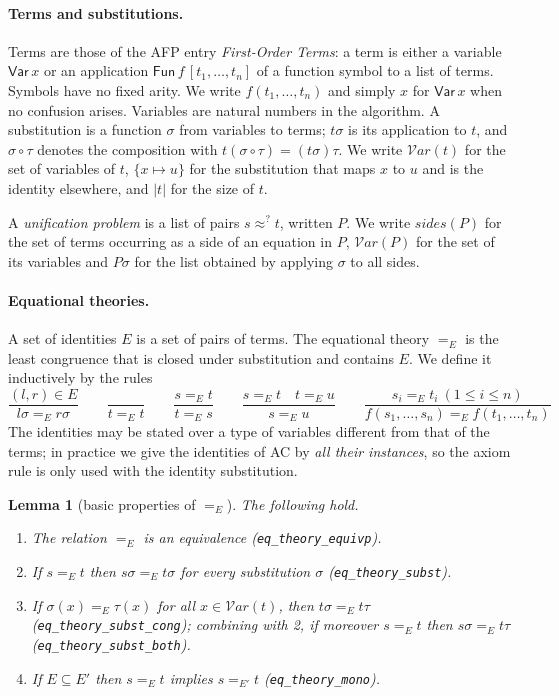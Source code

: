 \documentclass[11pt,a4paper]{article}
\newtheorem{lemma}[theorem]{Lemma}
\theoremstyle{definition}
\theoremstyle{remark}
\newcommand{\isa}[1]{\mbox{\small\texttt{#1}}}
\newcommand{\Var}{\mathsf{Var}}
\newcommand{\Fun}{\mathsf{Fun}}
\newcommand{\vars}{\mathcal{V}\mathit{ar}}
\newcommand{\sides}{\mathit{sides}}
\begin{document}
\paragraph{Terms and substitutions.}
Terms are those of the AFP entry \emph{First-Order Terms}: a term is either a variable $\Var\,x$
or an application $\Fun\,f\,[t_1,\dots,t_n]$ of a function symbol to a list of terms. Symbols have
no fixed arity. We write $f(t_1, \dots, t_n)$ and simply $x$ for $\Var\,x$ when no confusion
arises. Variables are natural numbers in the algorithm. A substitution is a function $\sigma$ from
variables to terms; $t\sigma$ is its application to $t$, and $\sigma\circ\tau$ denotes the
composition with $t(\sigma\circ\tau) = (t\sigma)\tau$. We write $\vars(t)$ for the set of
variables of $t$, $\{x \mapsto u\}$ for the substitution that maps $x$ to $u$ and is the identity
elsewhere, and $|t|$ for the size of $t$.

A \emph{unification problem} is a list of pairs $s \approx^? t$, written $P$. We write
$\sides(P)$ for the set of terms occurring as a side of an equation in $P$, $\vars(P)$ for the
set of its variables and $P\sigma$ for the list obtained by applying $\sigma$ to all sides.

\paragraph{Equational theories.}
A set of identities $E$ is a set of pairs of terms. The equational theory $=_E$ is the least
congruence that is closed under substitution and contains $E$. We define it inductively by the
rules
\[
  \frac{(l, r)\in E}{l\sigma =_E r\sigma}
  \qquad
  \frac{}{t =_E t}
  \qquad
  \frac{s =_E t}{t =_E s}
  \qquad
  \frac{s =_E t \quad t =_E u}{s =_E u}
  \qquad
  \frac{s_i =_E t_i \ (1\le i\le n)}{f(s_1,\dots,s_n) =_E f(t_1,\dots,t_n)}
\]
The identities may be stated over a type of variables different from that of the terms; in
practice we give the identities of AC by \emph{all their instances}, so the axiom rule is
only used with the identity substitution.

\begin{lemma}[basic properties of $=_E$]\label{lem:eqth}
  The following hold.
  \begin{enumerate}[nosep]
    \item The relation $=_E$ is an equivalence (\isa{eq\_theory\_equivp}).
    \item If $s =_E t$ then $s\sigma =_E t\sigma$ for every substitution $\sigma$
          (\isa{eq\_theory\_subst}).
    \item If $\sigma(x) =_E \tau(x)$ for all $x \in \vars(t)$, then $t\sigma =_E t\tau$
          (\isa{eq\_theory\_subst\_cong}); combining with 2, if moreover $s =_E t$ then
          $s\sigma =_E t\tau$ (\isa{eq\_theory\_subst\_both}).
    \item If $E \subseteq E'$ then $s =_E t$ implies $s =_{E'} t$ (\isa{eq\_theory\_mono}).
  \end{enumerate}
\end{lemma}
\end{document}
